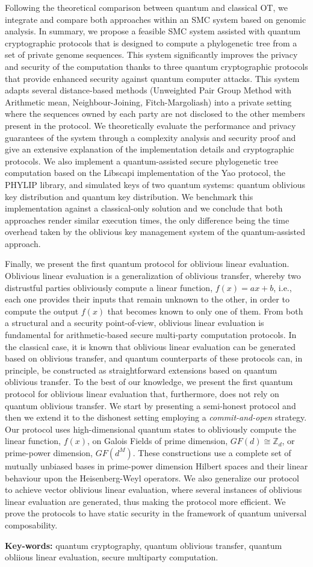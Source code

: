 Following the theoretical comparison between quantum and classical OT, we integrate and compare both approaches within an SMC system based on genomic analysis. In summary, we propose a feasible SMC system assisted with quantum cryptographic protocols that is designed to compute a phylogenetic tree from a set of private genome sequences. This system significantly improves the privacy and security of the computation thanks to three quantum cryptographic protocols that provide enhanced security against quantum computer attacks. This system adapts several distance-based methods (Unweighted Pair Group Method with Arithmetic mean, Neighbour-Joining, Fitch-Margoliash) into a private setting where the sequences owned by each party are not disclosed to the other members present in the protocol. We theoretically evaluate the performance and privacy guarantees of the system through a complexity analysis and security proof and give an extensive explanation of the implementation details and cryptographic protocols. We also implement a quantum-assisted secure phylogenetic tree computation based on the Libscapi implementation of the Yao protocol, the PHYLIP library, and simulated keys of two quantum systems: quantum oblivious key distribution and quantum key distribution. We benchmark this implementation against a classical-only solution and we conclude that both approaches render similar execution times, the only difference being the time overhead taken by the oblivious key management system of the quantum-assisted approach.

Finally, we present the first quantum protocol for oblivious linear evaluation. Oblivious linear evaluation is a generalization of oblivious transfer, whereby two distrustful parties obliviously compute a linear function, $f(x) = ax + b$, i.e., each one provides their inputs that remain  unknown to the other, in order to compute the output $f(x)$ that becomes known to only one of them. From both a structural and a security point-of-view, oblivious linear evaluation is fundamental for arithmetic-based secure multi-party computation protocols. In the classical case, it is known that oblivious linear evaluation can be generated based on oblivious transfer, and quantum counterparts of these protocols can, in principle, be constructed as straightforward extensions based on quantum oblivious transfer. To the best of our knowledge, we present the first quantum protocol for oblivious linear evaluation that, furthermore, does not rely on quantum oblivious transfer. We start by presenting a semi-honest protocol and then we extend it to the dishonest setting employing a \textit{commit-and-open} strategy. Our protocol uses high-dimensional quantum states to obliviously compute the linear function,  $f(x)$, on Galois Fields of prime dimension, $GF(d) \cong \mathbb{Z}_d$, or prime-power dimension, $GF(d^M)$. These constructions use a complete set of mutually unbiased bases in prime-power dimension Hilbert spaces and their linear behaviour upon the Heisenberg-Weyl operators.  We also generalize our protocol to achieve vector oblivious linear evaluation, where several instances of oblivious linear evaluation are generated, thus making the protocol more efficient. We prove the protocols to have static security in the framework of quantum universal composability.

\vfill

\begin{flushleft}
\textbf{Key-words:} quantum cryptography, quantum oblivious transfer, quantum obliious linear evaluation, secure multiparty computation.
\end{flushleft}
